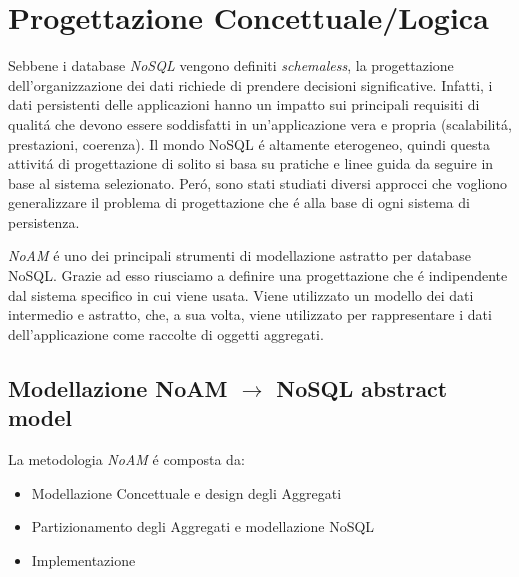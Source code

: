 \chapter{Progettazione Concettuale/Logica}
Sebbene i database \emph{NoSQL} vengono definiti \emph{schemaless}, la progettazione dell'organizzazione dei dati richiede
di prendere decisioni significative. Infatti, i dati persistenti delle applicazioni hanno un impatto sui principali requisiti
di qualitá che devono essere soddisfatti in un'applicazione vera e propria (scalabilitá, prestazioni, coerenza).
Il mondo NoSQL é altamente eterogeneo, quindi questa attivitá di progettazione di solito si basa su pratiche e linee guida da seguire
in base al sistema selezionato. Peró, sono stati studiati diversi approcci che vogliono generalizzare il problema di progettazione
che é alla base di ogni sistema di persistenza.

\emph{NoAM} é uno dei principali strumenti di modellazione astratto per database NoSQL. Grazie ad esso riusciamo a definire
una progettazione che é indipendente dal sistema specifico in cui viene usata. Viene utilizzato un modello dei dati intermedio e astratto,
che, a sua volta, viene utilizzato per rappresentare i dati dell'applicazione come raccolte di oggetti aggregati.
\section{Modellazione NoAM $\to$ NoSQL abstract model}
La metodologia \emph{NoAM} é composta da:
\begin{itemize}
    \item Modellazione Concettuale e design degli Aggregati
    \item Partizionamento degli Aggregati e modellazione NoSQL
    \item Implementazione
\end{itemize}

